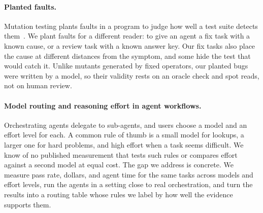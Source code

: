 \paragraph{Planted faults.}
Mutation testing plants faults in a program to judge how well a test suite detects them~\cite{demillo1978hints}. We plant faults for a different reader: to give an agent a fix task with a known cause, or a review task with a known answer key. Our fix tasks also place the cause at different distances from the symptom, and some hide the test that would catch it. Unlike mutants generated by fixed operators, our planted bugs were written by a model, so their validity rests on an oracle check and spot reads, not on human review.

\paragraph{Model routing and reasoning effort in agent workflows.}
Orchestrating agents delegate to sub-agents, and users choose a model and an effort level for each. A common rule of thumb is a small model for lookups, a larger one for hard problems, and high effort when a task seems difficult. We know of no published measurement that tests such rules or compares effort against a second model at equal cost. The gap we address is concrete. We measure pass rate, dollars, and agent time for the same tasks across models and effort levels, run the agents in a setting close to real orchestration, and turn the results into a routing table whose rules we label by how well the evidence supports them.
